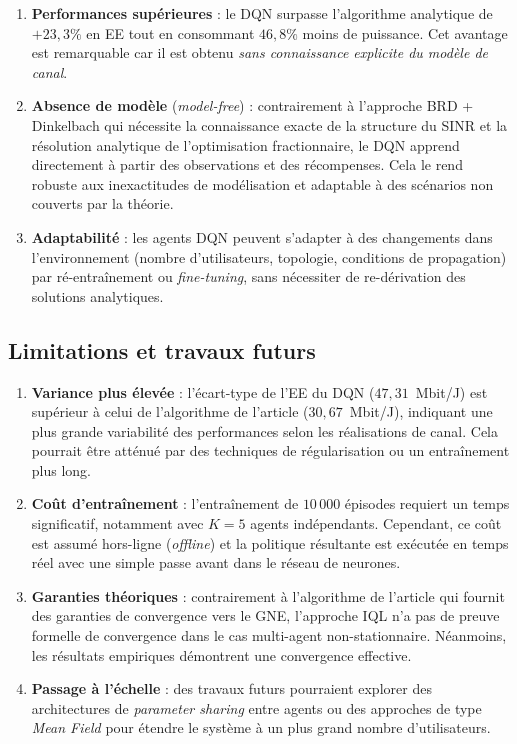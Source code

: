 \documentclass[conference]{IEEEtran}
\begin{document}
\begin{enumerate}
    \item \textbf{Performances supérieures} : le DQN surpasse l'algorithme analytique de $+23{,}3\%$ en EE tout en consommant $46{,}8\%$ moins de puissance. Cet avantage est remarquable car il est obtenu \textit{sans connaissance explicite du modèle de canal}.

    \item \textbf{Absence de modèle} (\textit{model-free}) : contrairement à l'approche BRD + Dinkelbach qui nécessite la connaissance exacte de la structure du SINR et la résolution analytique de l'optimisation fractionnaire, le DQN apprend directement à partir des observations et des récompenses. Cela le rend robuste aux inexactitudes de modélisation et adaptable à des scénarios non couverts par la théorie.

    \item \textbf{Adaptabilité} : les agents DQN peuvent s'adapter à des changements dans l'environnement (nombre d'utilisateurs, topologie, conditions de propagation) par ré-entraînement ou \textit{fine-tuning}, sans nécessiter de re-dérivation des solutions analytiques.
\end{enumerate}

\subsection{Limitations et travaux futurs}

\begin{enumerate}
    \item \textbf{Variance plus élevée} : l'écart-type de l'EE du DQN ($47{,}31$~Mbit/J) est supérieur à celui de l'algorithme de l'article ($30{,}67$~Mbit/J), indiquant une plus grande variabilité des performances selon les réalisations de canal. Cela pourrait être atténué par des techniques de régularisation ou un entraînement plus long.

    \item \textbf{Coût d'entraînement} : l'entraînement de $10\,000$ épisodes requiert un temps significatif, notamment avec $K = 5$ agents indépendants. Cependant, ce coût est assumé hors-ligne (\textit{offline}) et la politique résultante est exécutée en temps réel avec une simple passe avant dans le réseau de neurones.

    \item \textbf{Garanties théoriques} : contrairement à l'algorithme de l'article qui fournit des garanties de convergence vers le GNE, l'approche IQL n'a pas de preuve formelle de convergence dans le cas multi-agent non-stationnaire. Néanmoins, les résultats empiriques démontrent une convergence effective.

    \item \textbf{Passage à l'échelle} : des travaux futurs pourraient explorer des architectures de \textit{parameter sharing} entre agents ou des approches de type \textit{Mean Field} pour étendre le système à un plus grand nombre d'utilisateurs.
\end{enumerate}
\end{document}
